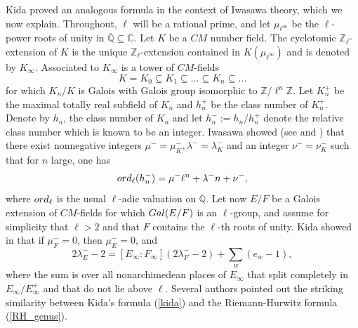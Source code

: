 \documentclass[11pt]{amsart}
\numberwithin{equation}{section}
\theoremstyle{remark}
\newcommand{\Z}{\mathbb{Z}}
\newcommand{\Q}{\mathbb{Q}}
\begin{document}
\par Kida proved an analogous formula in the context of Iwasawa theory, which we now explain. Throughout, $\ell$ will be a rational prime,  and let $\mu_{\ell^\infty}$ be the $\ell$-power roots of unity in $\overline{\Q} \subseteq \mathbb{C}$. Let $K$ be a $CM$ number field. The cyclotomic $\Z_\ell$-extension of $K$ is the unique $\Z_\ell$-extension contained in $K(\mu_{\ell^\infty})$ and is denoted by $K_\infty$. Associated to $K_{\infty}$ is a tower of $CM$-fields
$$K = K_{0} \subseteq K_{1} \subseteq \ldots \subseteq K_{n} \subseteq \ldots $$
for which $K_{n}/K$ is Galois with Galois group isomorphic to $\mathbb{Z}/\ell^{n}\mathbb{Z}$. Let $K_n^+$ be the maximal totally real subfield of $K_n$ and $h_n^+$ be the class number of $K_n^+$. Denote by $h_n$, the class number of $K_n$ and let $h_n^-:=h_n/h_n^+$ denote the relative class number which is known to be an integer. Iwasawa showed (see \cite{Iwasawa:1959} and \cite{iwasawa1973zl}) that there exist nonnegative integers $\mu^{-} = \mu_{K}^{-},\lambda^{-} =  \lambda_{K}^{-}$ and an integer $\nu^{-} = \nu_{K}^{-}$ such that for $n$ large, one has
\begin{equation} \label{Iwasawa}
{\rm ord}_{\ell}(h_{n}^{-}) = \mu^{-}  \ell^{n} + \lambda^{-} n + \nu^{-}, 
\end{equation}
where ${\rm ord}_{\ell}$ is the usual $\ell$-adic valuation on $\mathbb{Q}$.  Let now $E/F$ be a Galois extension of $CM$-fields for which ${\rm Gal}(E/F)$ is an $\ell$-group, and assume for simplicity that $\ell > 2$ and that $F$ contains the $\ell$-th roots of unity.  Kida showed in \cite{Kida:1980} that if $\mu_{F}^{-} = 0$, then $\mu_{E}^{-} = 0$, and 
\begin{equation} \label{kida}
2\lambda_{E}^{-} - 2 = [E_{\infty}:F_{\infty}](2 \lambda_{F}^{-} - 2) + \sum_{w}(e_{w} - 1),
\end{equation}
where the sum is over all nonarchimedean places of $E_{\infty}$ that split completely in $E_{\infty}/E_{\infty}^{+}$ and that do not lie above $\ell$.  Several authors pointed out the striking similarity between Kida's formula (\ref{kida}) and the Riemann-Hurwitz formula (\ref{RH_genus}).
\end{document}

